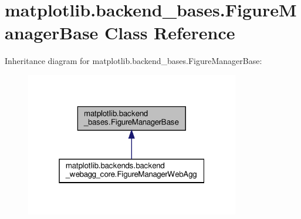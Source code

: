 \hypertarget{classmatplotlib_1_1backend__bases_1_1FigureManagerBase}{}\section{matplotlib.\+backend\+\_\+bases.\+Figure\+Manager\+Base Class Reference}
\label{classmatplotlib_1_1backend__bases_1_1FigureManagerBase}


Inheritance diagram for matplotlib.\+backend\+\_\+bases.\+Figure\+Manager\+Base\+:
\nopagebreak
\begin{figure}[H]
\begin{center}
\leavevmode
\includegraphics[width=265pt]{classmatplotlib_1_1backend__bases_1_1FigureManagerBase__inherit__graph}
\end{center}
\end{figure}
